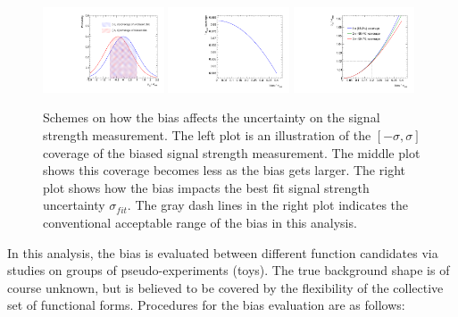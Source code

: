 \begin{figure}[!htb]
  \centering
  \captionsetup{justification=justified}
  \includegraphics[width=0.32\textwidth]{pics/VH_sec/bias_derivation/coverage_scheme.pdf}
  \includegraphics[width=0.32\textwidth]{pics/VH_sec/bias_derivation/coverage_1sigma.pdf}
  \includegraphics[width=0.32\textwidth]{pics/VH_sec/bias_derivation/sigma_fit.pdf}
  \caption{Schemes on how the bias affects the uncertainty on the signal strength measurement.
           The left plot is an illustration of the $[-\sigma, \sigma]$ coverage of the biased signal strength measurement.
           The middle plot shows this coverage becomes less as the bias gets larger.
           The right plot shows how the bias impacts the best fit signal strength uncertainty $\sigma_{fit}$.
           The gray dash lines in the right plot indicates the conventional acceptable range of the bias in this analysis.}
  \label{fig:bias_derivation}
\end{figure}

In this analysis, the bias is evaluated between different function candidates via studies on groups of pseudo-experiments (toys).
The true background shape is of course unknown, but is believed to be covered by the flexibility of the collective set of functional forms.
Procedures for the bias evaluation are as follows:

